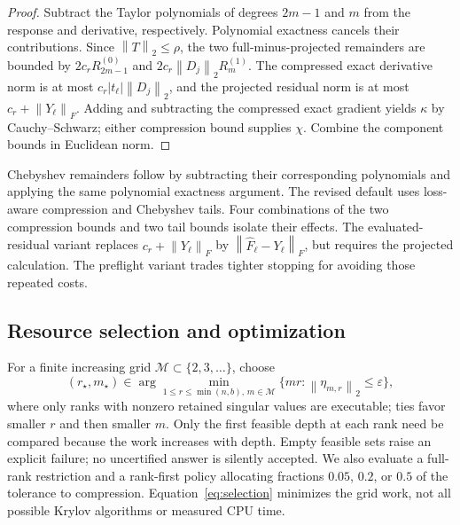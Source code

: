 \documentclass[10pt,letterpaper,twoside]{article}
\newcommand{\norm}[1]{\left\lVert #1\right\rVert}
\newcommand{\Fhat}{\widehat F}
\begin{document}
\begin{proof}
Subtract the Taylor polynomials of degrees $2m-1$ and $m$ from the response
and derivative, respectively. Polynomial exactness cancels their contributions.
Since $\norm T_2\le\rho$, the two full-minus-projected remainders are bounded
by $2c_rR_{2m-1}^{(0)}$ and $2c_r\norm{D_j}_2R_m^{(1)}$.
The compressed exact derivative norm is at most $c_r|t_\ell|\norm{D_j}_2$,
and the projected residual norm is at most $c_r+\norm{Y_\ell}_F$.
Adding and subtracting the compressed exact gradient yields $\kappa$ by
Cauchy--Schwarz; either compression bound supplies $\chi$. Combine the component
bounds in Euclidean norm.
\end{proof}
Chebyshev remainders follow by subtracting their corresponding polynomials
and applying the same polynomial exactness argument. The revised default
uses loss-aware compression and Chebyshev tails. Four combinations of the
two compression bounds and two tail bounds isolate their effects.
The evaluated-residual variant replaces $c_r+\norm{Y_\ell}_F$ by
$\norm{\Fhat_\ell-Y_\ell}_F$, but requires the projected calculation.
The preflight variant trades tighter stopping for avoiding those repeated costs.

\subsection{Resource selection and optimization}
For a finite increasing grid $\mathcal M\subset\{2,3,\ldots\}$, choose
\begin{equation}
 (r_\star,m_\star)\in\arg\min_{1\le r\le\min(n,b),\,m\in\mathcal M}
 \{mr:\norm{\eta_{m,r}}_2\le\varepsilon\},
 \label{eq:selection}
\end{equation}
where only ranks with nonzero retained singular values are executable;
ties favor smaller $r$ and then smaller $m$.
Only the first feasible depth at each rank need be compared because the work
increases with depth. Empty feasible sets raise an explicit failure; no
uncertified answer is silently accepted. We also evaluate a full-rank restriction
and a rank-first policy allocating fractions $0.05$, $0.2$, or $0.5$ of the
tolerance to compression. Equation~\eqref{eq:selection} minimizes the grid work,
not all possible Krylov algorithms or measured CPU time.
\end{document}
